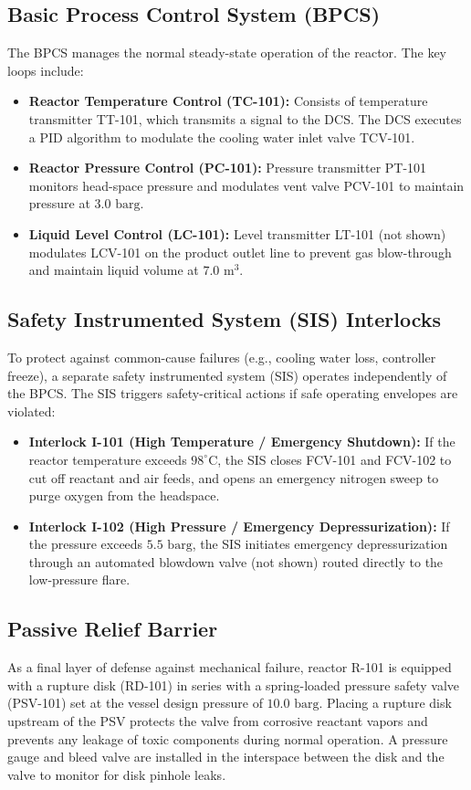 \subsection{Basic Process Control System (BPCS)}
The BPCS manages the normal steady-state operation of the reactor. The key loops include:
\begin{itemize}
    \item \textbf{Reactor Temperature Control (TC-101):} Consists of temperature transmitter TT-101, which transmits a signal to the DCS. The DCS executes a PID algorithm to modulate the cooling water inlet valve TCV-101.
    \item \textbf{Reactor Pressure Control (PC-101):} Pressure transmitter PT-101 monitors head-space pressure and modulates vent valve PCV-101 to maintain pressure at $3.0 \text{ barg}$.
    \item \textbf{Liquid Level Control (LC-101):} Level transmitter LT-101 (not shown) modulates LCV-101 on the product outlet line to prevent gas blow-through and maintain liquid volume at $7.0\text{ m}^3$.
\end{itemize}

\subsection{Safety Instrumented System (SIS) Interlocks}
To protect against common-cause failures (e.g., cooling water loss, controller freeze), a separate safety instrumented system (SIS) operates independently of the BPCS. The SIS triggers safety-critical actions if safe operating envelopes are violated:
\begin{itemize}
    \item \textbf{Interlock I-101 (High Temperature / Emergency Shutdown):} If the reactor temperature exceeds $98^\circ\text{C}$, the SIS closes FCV-101 and FCV-102 to cut off reactant and air feeds, and opens an emergency nitrogen sweep to purge oxygen from the headspace.
    \item \textbf{Interlock I-102 (High Pressure / Emergency Depressurization):} If the pressure exceeds $5.5 \text{ barg}$, the SIS initiates emergency depressurization through an automated blowdown valve (not shown) routed directly to the low-pressure flare.
\end{itemize}

\subsection{Passive Relief Barrier}
As a final layer of defense against mechanical failure, reactor R-101 is equipped with a rupture disk (RD-101) in series with a spring-loaded pressure safety valve (PSV-101) set at the vessel design pressure of $10.0 \text{ barg}$. Placing a rupture disk upstream of the PSV protects the valve from corrosive reactant vapors and prevents any leakage of toxic components during normal operation. A pressure gauge and bleed valve are installed in the interspace between the disk and the valve to monitor for disk pinhole leaks.
